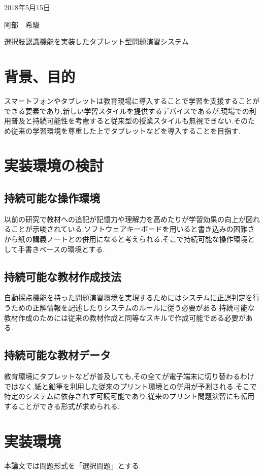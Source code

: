 \documentclass[a4j,11pt]{jsarticle}
\begin{document}
\begin{flushright} %
2018年5月15日

阿部　希駿
\end{flushright}

\begin{center}
\Large{選択肢認識機能を実装したタブレット型問題演習システム}
\end{center}

\section{背景、目的}
\label{sec:mokuteki}
スマートフォンやタブレットは教育現場に導入することで学習を支援することができる要素であり,新しい学習スタイルを提供するデバイスであるが,現場での利用普及と持続可能性を考慮すると従来型の授業スタイルも無視できない.そのため従来の学習環境を尊重した上でタブレットなどを導入することを目指す.　

\section{実装環境の検討}
\subsection{持続可能な操作環境}
以前の研究で教材への追記が記憶力や理解力を高めたりが学習効果の向上が図れることが示唆されている.ソフトウェアキーボードを用いると書き込みの困難さから紙の講義ノートとの併用になると考えられる.そこで持続可能な操作環境として手書きベースの環境とする.

\subsection{持続可能な教材作成技法}
自動採点機能を持った問題演習環境を実現するためにはシステムに正誤判定を行うための正解情報を記述したりシステムのルールに従う必要がある.持続可能な教材作成のためには従来の教材作成と同等なスキルで作成可能である必要がある.

\subsection{持続可能な教材データ}
教育環境にタブレットなどが普及しても,その全てが電子端末に切り替わるわけではなく,紙と鉛筆を利用した従来のプリント環境との併用が予測される.そこで特定のシステムに依存されず可読可能であり,従来のプリント問題演習にも転用することができる形式が求められる.

\section{実装環境}
本論文では問題形式を「選択問題」とする.
\end{document}
